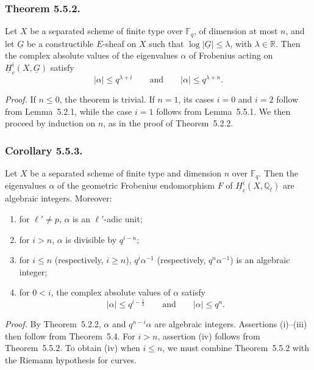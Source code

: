 \subsubsection*{Theorem 5.5.2.}
Let $X$ be a separated scheme of finite type over $\mathbb F_q$, of
dimension at most $n$, and let $\underline G$ be a constructible $E$-sheaf
on $X$ such that $\log|\underline G|\leq\lambda$, with
$\lambda\in\mathbb R$.  Then the complex absolute values of the eigenvalues
$\alpha$ of Frobenius acting on $\underline H_c^i(X,\underline G)$ satisfy
\[
|\alpha|\leq q^{\lambda+i}
\qquad\text{and}\qquad
|\alpha|\leq q^{\lambda+n}.
\]

\medskip
\noindent\emph{Proof.}
If $n\leq0$, the theorem is trivial.  If $n=1$, its cases $i=0$ and $i=2$
follow from Lemma~5.2.1, while the case $i=1$ follows from
Lemma~5.5.1.  We then proceed by induction on $n$, as in the proof of
Theorem~5.2.2.

\subsubsection*{Corollary 5.5.3.}
Let $X$ be a separated scheme of finite type and dimension $n$ over
$\mathbb F_q$.  Then the eigenvalues $\alpha$ of the geometric Frobenius
endomorphism $F$ of $\underline H_c^i(X,\mathbb Q_\ell)$ are algebraic
integers.  Moreover:
\begin{enumerate}[label=(\roman*)]
\item for $\ell'\ne p$, $\alpha$ is an $\ell'$-adic unit;
\item for $i>n$, $\alpha$ is divisible by $q^{i-n}$;
\item for $i\leq n$ (respectively, $i\geq n$),
  $q^i\alpha^{-1}$ (respectively, $q^n\alpha^{-1}$) is an algebraic integer;
\item for $0<i$, the complex absolute values of $\alpha$ satisfy
  \[
  |\alpha|\leq q^{i-\frac12}
  \qquad\text{and}\qquad
  |\alpha|\leq q^n.
  \]
\end{enumerate}

\medskip
\noindent\emph{Proof.}
By Theorem~5.2.2, $\alpha$ and $q^{n-i}\alpha$ are algebraic integers.
Assertions (i)--(iii) then follow from Theorem~5.4.  For $i>n$, assertion
(iv) follows from Theorem~5.5.2.  To obtain (iv) when $i\leq n$, we must
combine Theorem~5.5.2 with the Riemann hypothesis for curves.

